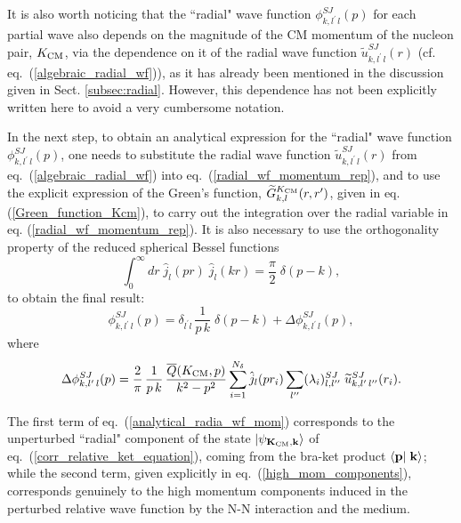 \documentclass[aps,twocolumn,showpacs,preprintnumbers,amsmath,amssymb,nofootinbib,superscriptaddress,showkeys,noeprint]{revtex4-1}
\newcommand{\nk}{{\bf k}}
\newcommand{\np}{{\bf p}}
\newcommand{\nK}{{\bf K}}
\begin{document}
It is also worth noticing that the ``radial" wave function
$\phi_{k,l^\prime\,l}^{SJ}(p)$ for each partial wave also depends on
the magnitude of the CM momentum of the nucleon pair, $K_{\rm CM}$,
via the dependence on it of the radial wave function
$\widetilde{u}^{SJ}_{k,l^\prime\,l}(r)$
(cf. eq.~(\ref{algebraic_radial_wf})), as it has already been
mentioned in the discussion given in Sect.
\ref{subsec:radial}. However, this dependence has not been explicitly
written here to avoid a very cumbersome notation.

In the next step, to obtain an analytical expression for the ``radial"
wave function $\phi_{k,l^\prime\,l}^{SJ}(p)$, one needs to substitute
the radial wave function $\widetilde{u}^{SJ}_{k,l^\prime\,l}(r)$ from
eq.~(\ref{algebraic_radial_wf}) into
eq.~(\ref{radial_wf_momentum_rep}), and to use the explicit expression
of the Green's function, $\widetilde{G}^{K_{\rm CM}}_{k,l}(r,r')$,
given in eq. (\ref{Green_function_Kcm}), to carry out the integration
over the radial variable in eq. (\ref{radial_wf_momentum_rep}).  It is
also necessary to use the orthogonality property of the reduced
spherical Bessel functions
\begin{equation}\label{orthogonality_bessel}
\int^{\infty}_0 dr \; \hat{j}_l(pr) \; \hat{j}_l(kr)= \frac{\pi}{2}\; \delta(p-k),
\end{equation}
to obtain the final result:
\begin{equation}\label{analytical_radia_wf_mom}
 \phi_{k,l^\prime\,l}^{SJ}(p) = \delta_{l^\prime l}\,\frac{1}{p\,k}\; \delta(p-k)
  + \Delta\phi^{SJ}_{k,l^\prime\,l}(p),
\end{equation}
where
\begin{equation}\label{high_mom_components}
\Delta\phi^{SJ}_{k,l^\prime\,l}(p)=\frac{2}{\pi}\,\frac{1}{p\,k}\,
\frac{\overline{Q}(K_{\rm CM},p)}{k^2-p^2}\sum^{N_\delta}_{i=1}
\hat{j}_l(pr_i)\sum_{l^{\prime\prime}} (\lambda_i)^{SJ}_{l,l^{\prime\prime}}\;
\widetilde{u}^{SJ}_{k,l^\prime\,l^{\prime\prime}}(r_i).
\end{equation}

The first term of eq.~(\ref{analytical_radia_wf_mom}) corresponds to
the unperturbed ``radial" component of the state $\left|
\psi_{\nK_{\rm CM},\nk} \right\rangle$ of
eq.~(\ref{corr_relative_ket_equation}), coming from the bra-ket
product $\left\langle \np \right| \left. \nk \right\rangle$; while the
second term, given explicitly in eq.~(\ref{high_mom_components}),
corresponds genuinely to the high momentum components induced in the
perturbed relative wave function by the N-N interaction and the
medium.
\end{document}
